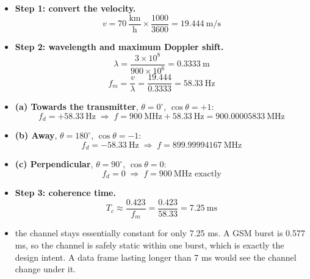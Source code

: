 \begin{itemize}
  \item \textbf{Step 1: convert the velocity.} 
        \[ v = 70\ \frac{\text{km}}{\text{h}} \times \frac{1000}{3600}
             = 19.444\ \text{m/s} \]
  \item \textbf{Step 2: wavelength and maximum Doppler shift.}
        \[ \lambda = \frac{3\times10^{8}}{900\times10^{6}} = 0.3333\ \text{m} \]
        \[ f_m = \frac{v}{\lambda} = \frac{19.444}{0.3333} = \boxed{58.33\ \text{Hz}} \]
  \item \textbf{(a) Towards the transmitter}, $\theta = 0^\circ$, $\cos\theta = +1$:
        \[ f_d = +58.33\ \text{Hz}
           \;\Rightarrow\; f = 900\ \text{MHz} + 58.33\ \text{Hz}
           = \boxed{900.00005833\ \text{MHz}} \]
  \item \textbf{(b) Away}, $\theta = 180^\circ$, $\cos\theta = -1$:
        \[ f_d = -58.33\ \text{Hz}
           \;\Rightarrow\; f = \boxed{899.99994167\ \text{MHz}} \]
  \item \textbf{(c) Perpendicular}, $\theta = 90^\circ$, $\cos\theta = 0$:
        \[ f_d = 0 \;\Rightarrow\; f = \boxed{900\ \text{MHz exactly}} \]
  \item \textbf{Step 3: coherence time.}
        \[ T_c \approx \frac{0.423}{f_m} = \frac{0.423}{58.33} = 7.25\ \text{ms} \]
  \item {} the channel stays essentially constant for only 7.25 ms. A GSM burst
        is 0.577 ms, so the channel is safely static within one burst, which is exactly the design
        intent. A data frame lasting longer than 7 ms would see the channel change under it.
\end{itemize}
